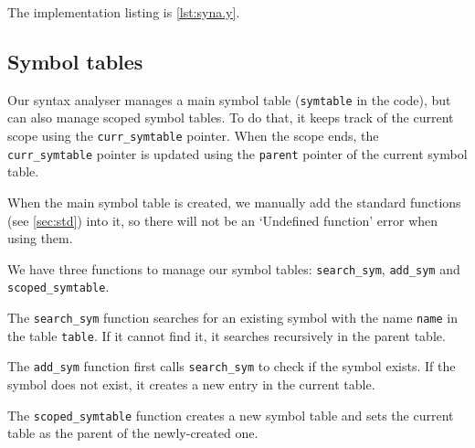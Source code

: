 \documentclass[a4paper,12pt,notitlepage,english]{article}
\begin{document}
  The implementation listing is \autoref{lst:syna.y}.

  \subsection{Symbol tables}

  Our syntax analyser manages a main symbol table (\texttt{symtable} in the code), but can also manage scoped symbol tables.
  To do that, it keeps track of the current scope using the \texttt{curr\_symtable} pointer.
  When the scope ends, the \texttt{curr\_symtable} pointer is updated using the \texttt{parent} pointer of the current symbol table.

  When the main symbol table is created, we manually add the standard functions (see \autoref{sec:std}) into it, so there will not be an `Undefined function' error when using them.

  We have three functions to manage our symbol tables: \texttt{search\_sym}, \texttt{add\_sym} and \texttt{scoped\_symtable}.

  \noindent\begin{minipage}{.3\linewidth}
    The \texttt{search\_sym} function searches for an existing symbol with the name \texttt{name} in the table \texttt{table}.
    If it cannot find it, it searches recursively in the parent table.
  \end{minipage}\hspace{.05\linewidth}\begin{minipage}{.65\linewidth}
    
  \end{minipage}

  \noindent\begin{minipage}{.3\linewidth}
    The \texttt{add\_sym} function first calls \texttt{search\_sym} to check if the symbol exists.
    If the symbol does not exist, it creates a new entry in the current table.
  \end{minipage}\hspace{.05\linewidth}\begin{minipage}{.65\linewidth}
    
  \end{minipage}

  \noindent\begin{minipage}{.3\linewidth}
    The \texttt{scoped\_symtable} function creates a new symbol table and sets the current table as the parent of the newly-created one.
  \end{minipage}\hspace{.05\linewidth}\begin{minipage}{.65\linewidth}
    
  \end{minipage}
\end{document}
